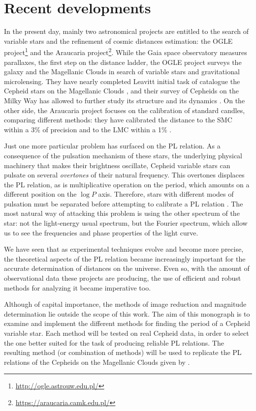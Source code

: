 \section{Recent developments}


In the present day, mainly two astronomical projects are entitled to the search of variable stars and the refinement of cosmic distances estimation:
the OGLE project\footnote{\url{http://ogle.astrouw.edu.pl/}} and the Araucaria project\footnote{\url{https://araucaria.camk.edu.pl/}}.
While the Gaia space observatory measures parallaxes, the first step on the distance ladder, 
the OGLE project surveys the galaxy and the Magellanic Clouds in search of variable stars and gravitational microlensing.
They have nearly completed Leavitt initial task of catalogue the Cepheid stars on the Magellanic Clouds \citep{OGLE2017},
and their survey of Cepheids on the Milky Way has allowed to further study its structure \citep{Skowron2019} and its dynamics \citep{Mroz2019}.
On the other side, the Araucaria project focuses on the calibration of standard candles, comparing different methods: 
they have calibrated the distance to the SMC within a 3\% of precision \citep{Araucaria2014} and to the LMC within a 1\% \citep{Araucaria2019}.



Just one more particular problem has surfaced on the PL relation. 
As a consequence of the pulsation mechanism of these stars, 
the underlying physical machinery that makes their brightness oscillate,
Cepheid variable stars can pulsate on several \textit{overtones} of their natural frequency.
This overtones displaces the PL relation, as is multiplicative operation on the period, 
which amounts on a different position on the $\log P$ axis.
Therefore, stars with different modes of pulsation must be separated before attempting to calibrate a PL relation \citep{Zabolotski2005}.
The most natural way of attacking this problem is using the other spectrum of the star: 
not the light-energy usual spectrum, but the Fourier spectrum, 
which allow us to see the frequencies and phase properties of the light curve.

We have seen that as experimental techniques evolve and become more precise, 
the theoretical aspects of the PL relation became increasingly important for the accurate determination of distances on the universe.
Even so, with the amount of observational data these projects are producing, 
the use of efficient and robust methods for analyzing it became imperative too.

Although of capital importance, the methods of image reduction and magnitude determination lie outside the scope of this work.
The aim of this monograph is to examine and implement the different methods for finding the period of a Cepheid variable star.
Each method will be tested on real Cepheid data, in order to select the one better suited for the task of producing reliable PL relations.
The resulting method (or combination of methods) will be used to replicate the PL relations of the Cepheids on the Magellanic Clouds given by \cite{OGLE2016}.



